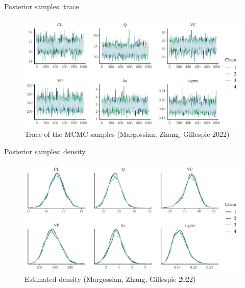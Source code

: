 \documentclass[bigger]{beamer}
\begin{document}
\begin{frame}[label={sec:orgfae21b4}]{Posterior samples: trace}
\begin{figure}[htbp]
\centering
\includegraphics[width=\textwidth]{./figure/twoCpt_trace.pdf}
\caption{Trace of the MCMC samples (Margossian, Zhang, Gillespie 2022)}
\end{figure}
\end{frame}

\begin{frame}[label={sec:org4de8c4d}]{Posterior samples: density}
\begin{figure}[htbp]
\centering
\includegraphics[width=\textwidth]{./figure/twoCpt_dens.pdf}
\caption{Estimated density (Margossian, Zhang, Gillespie 2022)}
\end{figure}
\end{frame}
\end{document}
